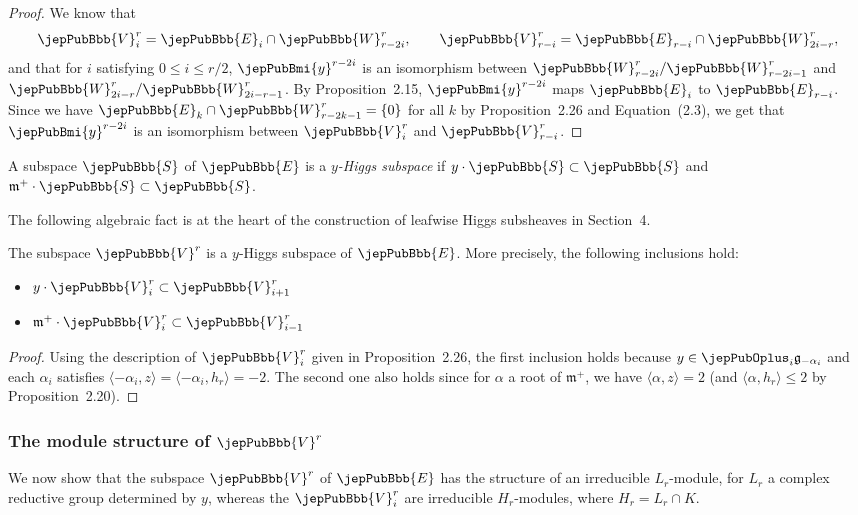 \begin{proof}
We know that
\[
\jepPubBbb{V}^r_i=\jepPubBbb{E}_i\cap\jepPubBbb{W}^r_{r-2i},\qquad\jepPubBbb{V}^r_{r-i}=\jepPubBbb{E}_{r-i}\cap\jepPubBbb{W}^r_{2i-r},
\]
and that for $i$ satisfying $0\leqslant i\leqslant r/2$, $\jepPubBmi{y}^{r-2i}$ is an isomorphism between $\jepPubBbb{W}^r_{r-2i}/\jepPubBbb{W}^r_{r-2i-1}$ and $\jepPubBbb{W}^r_{2i-r}/\jepPubBbb{W}^r_{2i-r-1}$. By Proposition~2.15, $\jepPubBmi{y}^{r-2i}$ maps $\jepPubBbb{E}_i$ to $\jepPubBbb{E}_{r-i}$. Since we have $\jepPubBbb{E}_k\cap\jepPubBbb{W}^r_{r-2k-1}=\{0\}$ for all $k$ by Proposition~2.26 and Equation~(2.3), we get that $\jepPubBmi{y}^{r-2i}$ is an isomorphism between $\jepPubBbb{V}^r_i$ and $\jepPubBbb{V}^r_{r-i}$.
\end{proof}
\begin{definition}
A subspace $\jepPubBbb{S}$ of $\jepPubBbb{E}$ is a \emph{$y$-Higgs subspace} if $y\cdot\jepPubBbb{S}\subset\jepPubBbb{S}$ and $\mathfrak m^+\cdot\jepPubBbb{S}\subset\jepPubBbb{S}$.
\end{definition}
The following algebraic fact is at the heart of the construction of leafwise Higgs subsheaves in Section~4.
\begin{proposition}
The subspace $\jepPubBbb{V}^r$ is a $y$-Higgs subspace of $\jepPubBbb{E}$. More precisely, the following inclusions hold:
\begin{itemize}
\item $y\cdot\jepPubBbb{V}^r_i\subset\jepPubBbb{V}^r_{i+1}$
\item $\mathfrak m^+\cdot\jepPubBbb{V}^r_i\subset\jepPubBbb{V}^r_{i-1}$
\end{itemize}
\end{proposition}
\begin{proof}
Using the description of $\jepPubBbb{V}^r_i$ given in Proposition~2.26, the first inclusion holds because $y\in\jepPubOplus_i\mathfrak g_{-\alpha_i}$ and each $\alpha_i$ satisfies $\langle-\alpha_i,z\rangle=\langle-\alpha_i,h_r\rangle=-2$. The second one also holds since for $\alpha$ a root of $\mathfrak m^+$, we have $\langle\alpha,z\rangle=2$ (and $\langle\alpha,h_r\rangle\leqslant2$ by Proposition~2.20).
\end{proof}
\subsubsection{The module structure of $\jepPubBbb{V}^r$}
We now show that the subspace $\jepPubBbb{V}^r$ of $\jepPubBbb{E}$ has the structure of an irreducible $L_r$-module, for $L_r$ a complex reductive group determined by $y$, whereas the $\jepPubBbb{V}^r_i$ are irreducible $H_r$-modules, where $H_r=L_r\cap K$.

